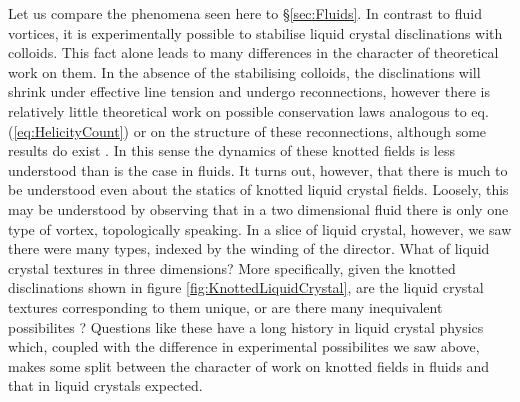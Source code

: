 Let us compare the phenomena seen here to \S\ref{sec:Fluids}. In contrast to fluid vortices, it is experimentally possible to stabilise liquid crystal disclinations with colloids. This fact alone leads to many differences in the character of theoretical work on them. In the absence of the stabilising colloids, the disclinations will shrink under effective line tension and undergo reconnections, however there is relatively little theoretical work on possible conservation laws analogous to eq. (\ref{eq:HelicityCount}) or on the structure of these reconnections, although some results do exist \cite{Machon}. In this sense the dynamics of these knotted fields is less understood than is the case in fluids.  It turns out, however, that there is much to be understood even about the statics of knotted liquid crystal fields. Loosely, this may be understood by observing that in a two dimensional fluid there is only one type of vortex, topologically speaking. In a slice of liquid crystal, however, we saw there were many types, indexed by the winding of the director. What of liquid crystal textures in three dimensions? More specifically, given the knotted disclinations shown in figure \ref{fig:KnottedLiquidCrystal}, are the liquid crystal textures corresponding to them unique, or are there many inequivalent possibilites ? Questions like these have a long history in liquid crystal physics which, coupled with the difference in experimental possibilites we saw above, makes some split between the character of work on knotted fields in fluids and that in liquid crystals expected.

